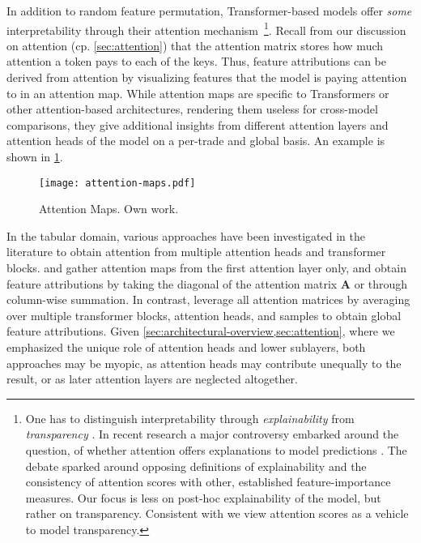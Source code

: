 In addition to random feature permutation, Transformer-based models offer \emph{some} interpretability through their attention mechanism~\footnote{One has to distinguish interpretability through \emph{explainability} from \emph{transparency} \autocite[][4--5]{liptonMythosModelInterpretability2017}. In recent research a major controversy embarked around the question, of whether attention offers explanations to model predictions \autocites[cp.][150]{bastingsElephantInterpretabilityRoom2020}[][5--7]{jainAttentionNotExplanation2019}[][9]{wiegreffeAttentionNotNot2019}. The debate sparked around opposing definitions of explainability and the consistency of attention scores with other, established feature-importance measures. Our focus is less on post-hoc explainability of the model, but rather on transparency. Consistent with \textcite[][8]{wiegreffeAttentionNotNot2019} we view attention scores as a vehicle to model transparency.
}. Recall from our discussion on attention (cp. \cref{sec:attention}) that the attention matrix stores how much attention a token pays to each of the keys. Thus, feature attributions can be derived from attention by visualizing features that the model is paying attention to in an attention map. While attention maps are specific to Transformers or other attention-based architectures, rendering them useless for cross-model comparisons, they give additional insights from different attention layers and attention heads of the model on a per-trade and global basis. An example is shown in \cref{fig:attention-maps}.

\begin{figure}[ht]
    \centering
    \texttt{[image: attention-maps.pdf]}
    \caption[Attention Maps]{Attention Maps. Own work.}
    \label{fig:attention-maps}
\end{figure}

In the tabular domain, various approaches have been investigated in the literature to obtain attention from multiple attention heads and transformer blocks. \textcite[][18]{somepalliSAINTImprovedNeural2021} and \textcite[][11]{borisovDeepNeuralNetworks2022} gather attention maps from the first attention layer only, and \textcite[][11]{borisovDeepNeuralNetworks2022} obtain feature attributions by taking the diagonal of the attention matrix $\mathbf{A}$ or through column-wise summation. In contrast, \textcite[][10]{gorishniyRevisitingDeepLearning2021} leverage all attention matrices by averaging over multiple transformer blocks, attention heads, and samples to obtain global feature attributions. Given \cref{sec:architectural-overview,sec:attention}, where we emphasized the unique role of attention heads and lower sublayers, both approaches may be myopic, as attention heads may contribute unequally to the result, or as later attention layers are neglected altogether.

